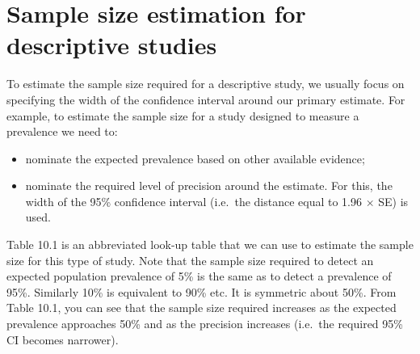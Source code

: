 \documentclass[
]{memoir}
\providecommand{\tightlist}{%
  \setlength{\itemsep}{0pt}\setlength{\parskip}{0pt}}
\begin{document}
\hypertarget{sample-size-estimation-for-descriptive-studies}{%
\section{Sample size estimation for descriptive studies}\label{sample-size-estimation-for-descriptive-studies}}

To estimate the sample size required for a descriptive study, we usually focus on specifying the width of the confidence interval around our primary estimate. For example, to estimate the sample size for a study designed to measure a prevalence we need to:

\begin{itemize}
\tightlist
\item
  nominate the expected prevalence based on other available evidence;
\item
  nominate the required level of precision around the estimate. For this, the width of the 95\% confidence interval (i.e.~the distance equal to 1.96 \(\times\) SE) is used.
\end{itemize}

Table 10.1 is an abbreviated look-up table that we can use to estimate the sample size for this type of study. Note that the sample size required to detect an expected population prevalence of 5\% is the same as to detect a prevalence of 95\%. Similarly 10\% is equivalent to 90\% etc. It is symmetric about 50\%. From Table 10.1, you can see that the sample size required increases as the expected prevalence approaches 50\% and as the precision increases (i.e.~the required 95\% CI becomes narrower).

 
  \providecommand{\huxb}[2]{\arrayrulecolor[RGB]{#1}\global\arrayrulewidth=#2pt}
  \providecommand{\huxvb}[2]{\color[RGB]{#1}\vrule width #2pt}
  \providecommand{\huxtpad}[1]{\rule{0pt}{#1}}
  \providecommand{\huxbpad}[1]{\rule[-#1]{0pt}{#1}}
\end{document}
